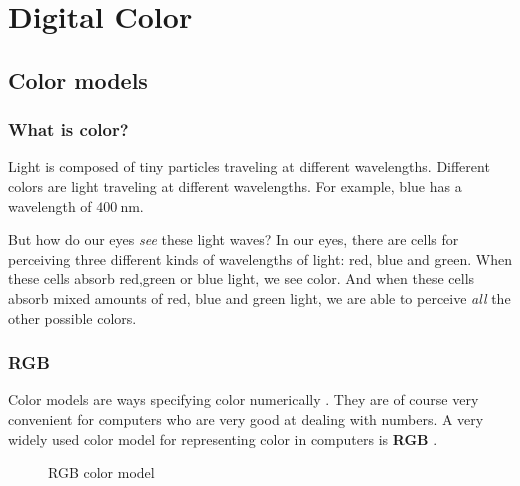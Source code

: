 \begin{comment}
  
\end{comment}

\chapter{Digital Color}
\label{cha:color}

\begin{refsection}

  \section{Color models}
  \label{sec:color-models}

  \subsection{What is color?}
  \label{sec:what-color}

  \newcommand{\bluewave}{\ensuremath{\SI{400}{\nano\meter}}}

  Light is composed of tiny particles traveling at different
  wavelengths. \cite{neider93:_openg_progr_guide} Different colors
  are light traveling at different wavelengths. For example, blue has
  a wavelength of \bluewave. \cite{ohlsson99:_digit_bild_kreat}

  But how do our eyes \textit{see} these light waves? In our eyes,
  there are cells for perceiving three different kinds of wavelengths
  of light: red, blue and green. When these cells absorb red,green or
  blue light, we see color. And when these cells absorb mixed amounts
  of red, blue and green light, we are able to perceive \textit{all}
  the other possible colors.

  \subsection{RGB}
  \label{sec:rgb}

  Color models  are ways specifying color numerically 
  \cite{fadgi11:color_model}. They are of course very convenient for
  computers who are very good at dealing with numbers. A very widely
  used color model for representing color in computers is \textbf{RGB}
  .

  \begin{figure}[h]
    \centering
    \caption{RGB color model}
    \label{fig:rgb}
  \end{figure}


\end{refsection}

